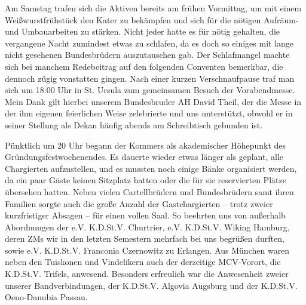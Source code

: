 \begin{multicols}{2}
Am Samstag trafen sich die Aktiven bereits am frühen Vormittag, um mit einem Weißwurstfrühstück den Kater zu bekämpfen und sich für die nötigen Aufräum- und Umbauarbeiten zu stärken. Nicht jeder hatte es für nötig gehalten, die vergangene Nacht zumindest etwas zu schlafen, da es doch so einiges mit lange nicht gesehenen Bundesbrüdern auszutauschen gab. Der Schlafmangel machte sich bei manchem Redebeitrag auf den folgenden Conventen bemerkbar, die dennoch zügig vonstatten gingen. Nach einer kurzen Verschnaufpause traf man sich um 18:00 Uhr in St. Ursula zum gemeinsamen Besuch der Vorabendmesse. Mein Dank gilt hierbei unserem Bundesbruder AH David Theil, der die Messe in der ihm eigenen feierlichen Weise zelebrierte und uns unterstützt, obwohl er in seiner Stellung als Dekan häufig abends am Schreibtisch gebunden ist.

Pünktlich um 20 Uhr begann der Kommers als akademischer Höhepunkt des Gründungsfestwochenendes. Es dauerte wieder etwas länger als geplant, alle Chargierten aufzustellen, und es mussten noch einige Bänke organisiert werden, da ein paar Gäste keinen Sitzplatz hatten oder die für sie reservierten Plätze übersehen hatten. Neben vielen Cartellbrüdern und Bundesbrüdern samt ihren Familien sorgte auch die große Anzahl der Gastchargierten – trotz zweier kurzfristiger Absagen – für einen vollen Saal. So beehrten uns von außerhalb Abordnungen der e.V. K.D.St.V. Churtrier, e.V. K.D.St.V. Wiking Hamburg, deren ZMs wir in den letzten Semestern mehrfach bei uns begrüßen durften, sowie e.V. K.D.St.V. Franconia Czernowitz zu Erlangen. Aus München waren neben den Tuiskonen und Vindelikern auch der derzeitige MCV-Vorort, die K.D.St.V. Trifels, anwesend. Besonders erfreulich war die Anwesenheit zweier unserer Bandverbindungen, der K.D.St.V. Algovia Augsburg und der K.D.St.V. Oeno-Danubia Passau.


\end{multicols}
